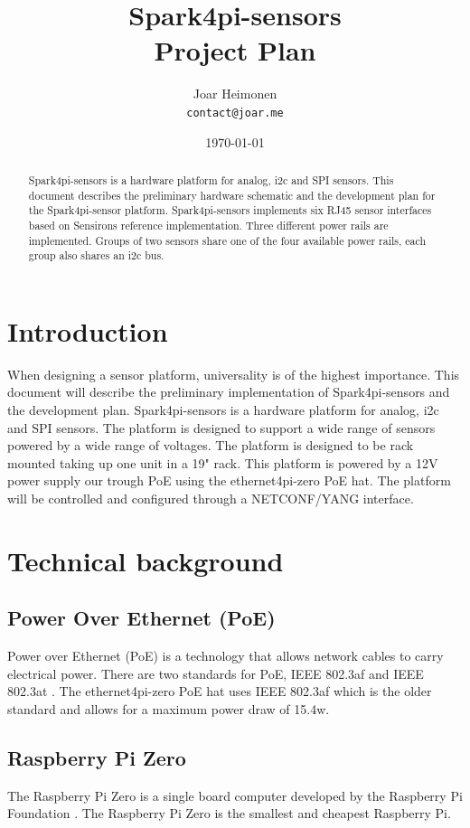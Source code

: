 \documentclass[12pt]{article}
\author{
    Joar Heimonen\\
    \texttt{contact@joar.me}
}
\title{
    \textbf{Spark4pi-sensors}\\[0.5em]
    \large Project Plan
}
\date{\today}
\begin{document}
\maketitle

\begin{abstract}
    \noindent Spark4pi-sensors is a hardware platform for analog, i2c and SPI sensors. 
    This document describes the preliminary hardware schematic and the development plan for the Spark4pi-sensor platform. 
    Spark4pi-sensors implements six RJ45 sensor interfaces based on Sensirons reference implementation. 
    Three different power rails are implemented. Groups of two sensors share one of the four available
    power rails, each group also shares an i2c bus.
\end{abstract}

\pagebreak

\tableofcontents

\pagebreak


\section{Introduction}
When designing a sensor platform, universality is of the highest importance. This document will describe the preliminary implementation of Spark4pi-sensors and the development plan.
Spark4pi-sensors is a hardware platform for analog, i2c and SPI sensors. The platform is designed to support a wide range of sensors powered by a wide range of voltages.
The platform is designed to be rack mounted taking up one unit in a 19" rack. This platform is powered by a 12V power supply our trough PoE using the ethernet4pi-zero PoE hat.
The platform will be controlled and configured through a NETCONF/YANG interface. 


\section{Technical background}
\subsection{Power Over Ethernet (PoE)}
Power over Ethernet (PoE) is a technology that allows network cables to carry electrical power. 
There are two standards for PoE, IEEE 802.3af and IEEE 802.3at \cite{IEEEStandardsAssociation}. The ethernet4pi-zero PoE hat uses IEEE 802.3af which 
is the older standard and allows for a maximum power draw of 15.4w.

\subsection{Raspberry Pi Zero}
The Raspberry Pi Zero is a single board computer developed by the Raspberry Pi Foundation \cite{foundationTeachLearnMake2025}. 
The Raspberry Pi Zero is the smallest and cheapest Raspberry Pi.
\end{document}
